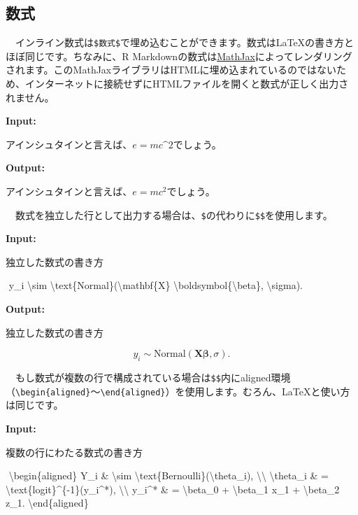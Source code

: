 \documentclass[
  a4paper,
  pandoc,
  ja=standard,
  jafont=haranoaji]{bxjsbook}
\newenvironment{Shaded}{\begin{snugshade}}{\end{snugshade}}
\newcommand{\NormalTok}[1]{\textcolor[rgb]{0.00,0.48,0.65}{#1}}
\newcommand{\SpecialCharTok}[1]{\textcolor[rgb]{0.37,0.37,0.37}{#1}}
\begin{document}
\hypertarget{ux6570ux5f0f}{%
\subsection{数式}\label{ux6570ux5f0f}}

　インライン数式は\texttt{\$数式\$}で埋め込むことができます。数式はLaTeXの書き方とほぼ同じです。ちなみに、R
Markdownの数式は\href{https://www.mathjax.org}{MathJax}によってレンダリングされます。このMathJaxライブラリはHTMLに埋め込まれているのではないため、インターネットに接続せずにHTMLファイルを開くと数式が正しく出力されません。

\textbf{Input:}

\begin{Shaded}
\begin{Highlighting}[]
\NormalTok{アインシュタインと言えば、$e = mc\^{}2$でしょう。}
\end{Highlighting}
\end{Shaded}

\textbf{Output:}

アインシュタインと言えば、\(e = mc^2\)でしょう。

　数式を独立した行として出力する場合は、\texttt{\$}の代わりに\texttt{\$\$}を使用します。

\textbf{Input:}

\begin{Shaded}
\begin{Highlighting}[]
\NormalTok{独立した数式の書き方}

\NormalTok{$$}
\NormalTok{y\_i \textbackslash{}sim \textbackslash{}text\{Normal\}(\textbackslash{}mathbf\{X\} \textbackslash{}boldsymbol\{\textbackslash{}beta\}, \textbackslash{}sigma).}
\NormalTok{$$}
\end{Highlighting}
\end{Shaded}

\textbf{Output:}

独立した数式の書き方

\[
y_i \sim \text{Normal}(\mathbf{X} \boldsymbol{\beta}, \sigma).
\]

　もし数式が複数の行で構成されている場合は\texttt{\$\$}内にaligned環境（\texttt{\textbackslash{}begin\{aligned\}}〜\texttt{\textbackslash{}end\{aligned\}}）を使用します。むろん、LaTeXと使い方は同じです。

\textbf{Input:}

\begin{Shaded}
\begin{Highlighting}[]
\NormalTok{複数の行にわたる数式の書き方}

\NormalTok{$$}
\NormalTok{\textbackslash{}begin\{aligned\}}
\NormalTok{  Y\_i      \& \textbackslash{}sim \textbackslash{}text\{Bernoulli\}(\textbackslash{}theta\_i), }\SpecialCharTok{\textbackslash{}\textbackslash{}}
\NormalTok{  \textbackslash{}theta\_i \& = \textbackslash{}text\{logit\}\^{}\{{-}1\}(y\_i\^{}*), }\SpecialCharTok{\textbackslash{}\textbackslash{}}
\NormalTok{  y\_i\^{}*    \& = \textbackslash{}beta\_0 + \textbackslash{}beta\_1 x\_1 + \textbackslash{}beta\_2 z\_1.}
\NormalTok{\textbackslash{}end\{aligned\}}
\NormalTok{$$}
\end{Highlighting}
\end{Shaded}
\end{document}
